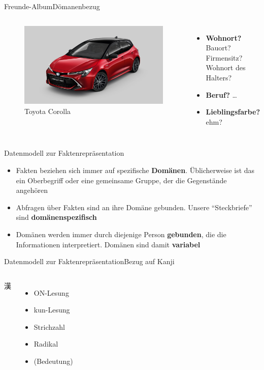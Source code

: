 \documentclass[aspectratio=169,compress]{beamer}
\begin{document}
\begin{frame}{Freunde-Album}{Dömanenbezug}
	\begin{columns}[c]
		\begin{figure}
			\includegraphics[scale=.085]{toyota_corolla_rot}
			\caption{Toyota Corolla}
		\end{figure}
		\begin{itemize}
			\item \textbf{Wohnort?} \pause Bauort? \pause Firmensitz? \pause Wohnort des Halters? \pause
			\item \textbf{Beruf?} … \pause
			\item \textbf{Lieblingsfarbe?} ehm?
		\end{itemize}
	\end{columns}
\end{frame}

\begin{frame}{Datenmodell zur Faktenrepräsentation}
	\begin{itemize}
		\item Fakten beziehen sich immer auf spezifische \textbf{Domänen}. Üblicherweise ist das ein Oberbegriff oder eine gemeinsame Gruppe, der die Gegenstände angehören \pause
		\item Abfragen über Fakten sind an ihre Domäne gebunden. Unsere \enquote{Steckbriefe} sind \textbf{domänenspezifisch} \pause
		\item Domänen werden immer durch diejenige Person \textbf{gebunden}, die die Informationen interpretiert. Domänen sind damit \textbf{variabel}
	\end{itemize}
\end{frame}

\begin{frame}{Datenmodell zur Faktenrepräsentation}{Bezug auf Kanji}
	\begin{columns}[c]
		\center \Huge 漢
		 \pause
		\begin{itemize}
			\item ON-Lesung
			\item kun-Lesung
			\item Strichzahl
			\item Radikal
			\item (Bedeutung)
		\end{itemize}
	\end{columns}
\end{frame}
\end{document}
